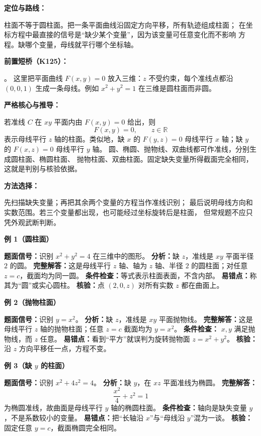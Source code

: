 \begin{knowledgeBox}
\textbf{定位与路线：}

柱面不等于圆柱面。把一条平面曲线沿固定方向平移，所有轨迹组成柱面；
在坐标方程中最直接的信号是“缺少某个变量”，因为该变量可任意变化而不影响
方程。缺哪个变量，母线就平行哪个坐标轴。

\textbf{前置短桥（K125）：}

。
这里把平面曲线 \(F(x,y)=0\) 放入三维：\(z\) 不受约束，每个准线点都沿
\((0,0,1)\) 生成一条母线。例如 \(x^2+y^2=1\) 在三维是圆柱面而非圆。

\textbf{严格核心与推导：}

若准线 \(C\) 在 \(xy\) 平面内由 \(F(x,y)=0\) 给出，则
\[
F(x,y)=0,\qquad z\in\mathbb R
\]
表示母线平行 \(z\) 轴的柱面。类似地，缺 \(x\) 的 \(F(y,z)=0\)
母线平行 \(x\) 轴；缺 \(y\) 的 \(F(x,z)=0\) 母线平行 \(y\) 轴。
圆、椭圆、抛物线、双曲线都可作准线，分别生成圆柱面、椭圆柱面、
抛物柱面、双曲柱面。固定缺失变量所得截面完全相同，这就是判别与核验依据。

\textbf{方法选择：}

先扫描缺失变量；再把其余两个变量的方程当作准线识别；
最后说明母线方向和实数范围。若三个变量都出现，也可能经过坐标旋转后是柱面，
但常规题不应只凭外观武断判断。

\textbf{例 1（圆柱面）}

\textbf{题面信号：}识别 \(x^2+y^2=4\) 在三维中的图形。
\textbf{分析：}缺 \(z\)，准线是 \(xy\) 平面半径 \(2\) 的圆。
\textbf{完整解答：}这是母线平行 \(z\) 轴、轴为 \(z\) 轴、半径 \(2\)
的圆柱面；对任意 \(z=c\)，截面均为同一圆。
\textbf{条件检查：}等式表示柱面表面，不含内部。
\textbf{易错点：}称其为“圆”或实心圆柱。
\textbf{核验：}点 \((2,0,z)\) 对所有实数 \(z\) 都在曲面上。

\textbf{例 2（抛物柱面）}

\textbf{题面信号：}识别 \(y=x^2\)。
\textbf{分析：}缺 \(z\)，准线是 \(xy\) 平面抛物线。
\textbf{完整解答：}这是母线平行 \(z\) 轴的抛物柱面；任意
\(z=c\) 截面均为 \(y=x^2\)。
\textbf{条件检查：} \(x,y\) 满足抛物线，而 \(z\) 任意。
\textbf{易错点：}看到“平方”就误判为旋转抛物面 \(z=x^2+y^2\)。
\textbf{核验：}沿 \(z\) 方向平移任一点，方程不变。

\textbf{例 3（缺 \(y\) 的柱面）}

\textbf{题面信号：}识别 \(x^2+4z^2=4\)。
\textbf{分析：}缺 \(y\)，在 \(xz\) 平面准线为椭圆。
\textbf{完整解答：}
\[
\frac{x^2}{4}+z^2=1
\]
为椭圆准线，故曲面是母线平行 \(y\) 轴的椭圆柱面。
\textbf{条件检查：}轴向是缺失变量 \(y\)，不是系数较小的变量。
\textbf{易错点：}把“长轴沿 \(x\)”与“母线沿 \(y\)”混为一谈。
\textbf{核验：}固定任意 \(y=c\)，截面椭圆完全相同。


\end{knowledgeBox}

